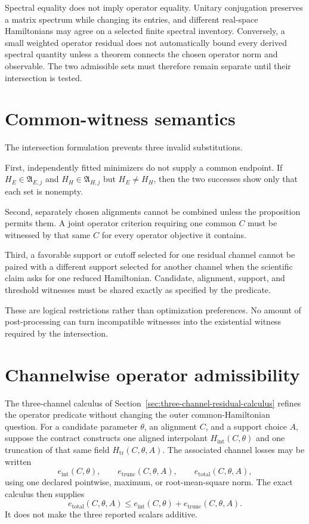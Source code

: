 Spectral equality does not imply operator equality.  Unitary conjugation preserves a
matrix spectrum while changing its entries, and different real-space Hamiltonians may
agree on a selected finite spectral inventory.  Conversely, a small weighted operator
residual does not automatically bound every derived spectral quantity unless a theorem
connects the chosen operator norm and observable.  The two admissible sets must
therefore remain separate until their intersection is tested.

\section{Common-witness semantics}

The intersection formulation prevents three invalid substitutions.

First, independently fitted minimizers do not supply a common endpoint.  If
$H_E\in\mathfrak A_{E,j}$ and $H_H\in\mathfrak A_{H,j}$ but $H_E\neq H_H$, then the two
successes show only that each set is nonempty.

Second, separately chosen alignments cannot be combined unless the proposition permits
them.  A joint operator criterion requiring one common $C$ must be witnessed by that
same $C$ for every operator objective it contains.

Third, a favorable support or cutoff selected for one residual channel cannot be paired
with a different support selected for another channel when the scientific claim asks
for one reduced Hamiltonian.  Candidate, alignment, support, and threshold witnesses
must be shared exactly as specified by the predicate.

These are logical restrictions rather than optimization preferences.  No amount of
post-processing can turn incompatible witnesses into the existential witness required
by the intersection.

\section{Channelwise operator admissibility}
\label{sec:channelwise-operator-admissibility}

The three-channel calculus of
Section~\ref{sec:three-channel-residual-calculus} refines the operator predicate without
changing the outer common-Hamiltonian question.  For a candidate parameter $\theta$, an
alignment $C$, and a support choice $A$, suppose the contract constructs one aligned
interpolant $H_{\mathrm{int}}(C,\theta)$ and one truncation of that same field
$H_{\mathrm{tr}}(C,\theta,A)$.  The associated channel losses may be written
\[
  e_{\mathrm{int}}(C,\theta),\qquad
  e_{\mathrm{trunc}}(C,\theta,A),\qquad
  e_{\mathrm{total}}(C,\theta,A),
\]
using one declared pointwise, maximum, or root-mean-square norm.  The exact calculus
then supplies
\[
  e_{\mathrm{total}}(C,\theta,A)
  \leq
  e_{\mathrm{int}}(C,\theta)
  +e_{\mathrm{trunc}}(C,\theta,A).
\]
It does not make the three reported scalars additive.

